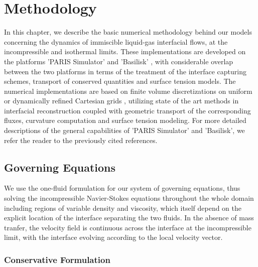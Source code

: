\setchapterpreamble[u]{\margintoc}
\chapter{Methodology}

In this chapter, we describe the basic numerical methodology behind our models 
concerning the dynamics of immiscible liquid-gas interfacial flows, at the incompressible and isothermal limits. 
These implementations are developed on the platforms 'PARIS Simulator' \cite{paris} and 
'Basilisk' \cite{basilisk}, with considerable overlap between the two platforms in terms 
of the treatment of the interface capturing schemes, transport of conserved quantities and surface tension models.
The numerical implementations are based on finite volume discretizations on uniform or dynamically refined Cartesian grids , utilizing
state of the art methods in interfacial reconstruction coupled with geometric
transport of the corresponding fluxes, curvature computation and surface tension modeling. For more detailed
descriptions of the general capabilities of 'PARIS Simulator’ and 'Basilisk', we refer the reader to the previously cited references. 


\section{Governing Equations}

We use the one-fluid formulation for our system of governing equations, thus solving 
the incompressible Navier-Stokes equations throughout the whole domain including regions 
of variable density and viscosity, which itself depend on the explicit 
location of the interface separating the two fluids.
In the absence of mass tranfer, the velocity field is continuous across
the interface at the incompressible limit, with the interface evolving according to the local velocity vector.  

\subsection*{Conservative Formulation}

